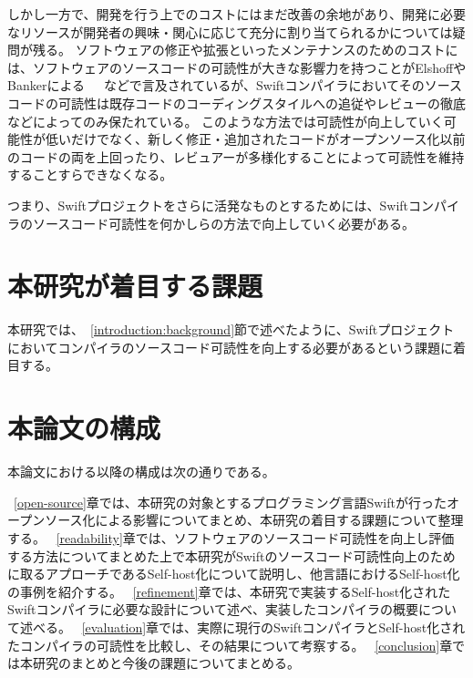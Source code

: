 しかし一方で、開発を行う上でのコストにはまだ改善の余地があり、開発に必要なリソースが開発者の興味・関心に応じて充分に割り当てられるかについては疑問が残る。
ソフトウェアの修正や拡張といったメンテナンスのためのコストには、ソフトウェアのソースコードの可読性が大きな影響力を持つことがElshoffやBankerによる~\cite{elshoff}~\cite{banker-datar}~\cite{banker-davis}などで言及されているが、Swiftコンパイラにおいてそのソースコードの可読性は既存コードのコーディングスタイルへの追従やレビューの徹底などによってのみ保たれている。
このような方法では可読性が向上していく可能性が低いだけでなく、新しく修正・追加されたコードがオープンソース化以前のコードの両を上回ったり、レビュアーが多様化することによって可読性を維持することすらできなくなる。

つまり、Swiftプロジェクトをさらに活発なものとするためには、Swiftコンパイラのソースコード可読性を何かしらの方法で向上していく必要がある。

\section{本研究が着目する課題}
\label{introduction:issue}

本研究では、~\ref{introduction:background}節で述べたように、Swiftプロジェクトにおいてコンパイラのソースコード可読性を向上する必要があるという課題に着目する。

\section{本論文の構成}

本論文における以降の構成は次の通りである。

~\ref{open-source}章では、本研究の対象とするプログラミング言語Swiftが行ったオープンソース化による影響についてまとめ、本研究の着目する課題について整理する。
~\ref{readability}章では、ソフトウェアのソースコード可読性を向上し評価する方法についてまとめた上で本研究がSwiftのソースコード可読性向上のために取るアプローチであるSelf-host化について説明し、他言語におけるSelf-host化の事例を紹介する。
~\ref{refinement}章では、本研究で実装するSelf-host化されたSwiftコンパイラに必要な設計について述べ、実装したコンパイラの概要について述べる。
~\ref{evaluation}章では、実際に現行のSwiftコンパイラとSelf-host化されたコンパイラの可読性を比較し、その結果について考察する。
~\ref{conclusion}章では本研究のまとめと今後の課題についてまとめる。

